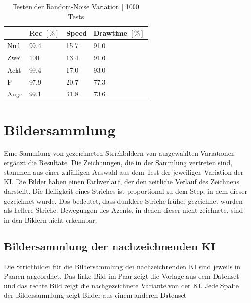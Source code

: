 \begin{table}[!ht]
    \centering
    \caption{Testen der Random-Noise Variation | 1000 Tests}\label{tab:gen-noisy}
    \begin{tabular}{|l|l|l|l|}
    \hline
        ~ & Rec $[\%]$ & Speed & Drawtime $[\%]$ \\ \hline
        Null & 99.4 & 15.7 & 91.0 \\ \hline
        Zwei & 100 & 13.4 & 91.6 \\ \hline
        Acht & 99.4 & 17.0 & 93.0 \\ \hline
        F & 97.9 & 20.7 & 77.3 \\ \hline
        Auge & 99.1 & 61.8 & 73.6 \\ \hline
    \end{tabular}
\end{table}




\section{Bildersammlung}\label{chap:r_bild} Eine Sammlung von gezeichneten
Strichbildern von ausgewählten Variationen ergänzt die Resultate. Die Zeichnungen, die in der Sammlung
vertreten sind, stammen aus einer zufälligen Auswahl aus dem Test der jeweiligen
Variation der KI. Die Bilder haben einen Farbverlauf, der den zeitliche Verlauf
des Zeichnens darstellt. Die Helligkeit eines Striches ist proportional zu dem
Step, in dem dieser gezeichnet wurde. Das bedeutet, dass dunklere Striche früher
gezeichnet wurden als hellere Striche. Bewegungen des Agents, in denen dieser
nicht zeichnete, sind in den Bildern nicht erkennbar.


\subsection{Bildersammlung der nachzeichnenden KI}\label{sub:r_bild_nach}

Die Strichbilder für die Bildersammlung der nachzeichnenden KI sind jeweils in Paaren
angeordnet. Das linke Bild im Paar zeigt die Vorlage aus dem Datenset und das
rechte Bild zeigt die nachgezeichnete Variante von der KI. Jede Spalte der
Bildersammlung zeigt Bilder aus einem anderen Datenset

\newpage

